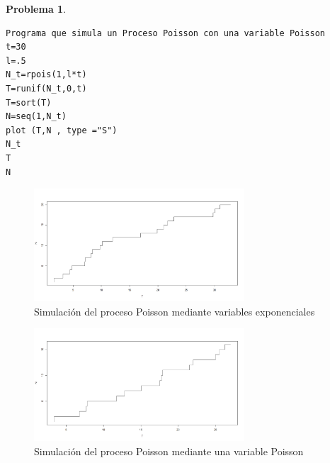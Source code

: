\documentclass[a5paper,oneside]{amsart}
\theoremstyle{plain}
\theoremstyle{definition}
\newtheorem{problema}{Problema}
\begin{document}
\begin{problema}
\begin{enumerate}
\begin{lstlisting}
Programa que simula un Proceso Poisson con una variable Poisson
t=30
l=.5
N_t=rpois(1,l*t)
T=runif(N_t,0,t)
T=sort(T)
N=seq(1,N_t)
plot (T,N , type ="S")
N_t
T
N
\end{lstlisting}
\begin{figure}
\centering
\includegraphics[width=0.7\textwidth]{simexp.png}
\caption{ Simulaci\'on del proceso Poisson mediante variables exponenciales}
\label{1}
\end{figure}
\begin{figure}
\centering
\includegraphics[width=0.7\textwidth]{simpos.png}
\caption{ Simulaci\'on del proceso Poisson mediante una variable Poisson}
\label{2}
\end{figure}
\end{enumerate}
\end{problema}
\end{document}
